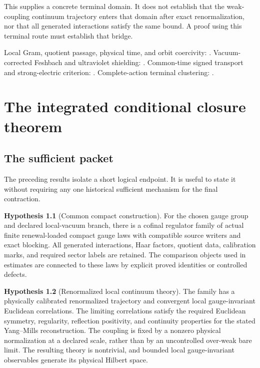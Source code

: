 \documentclass[11pt,oneside,openany]{book}
\theoremstyle{definition}
\newtheorem{hypothesis}[hypothesis]{Hypothesis}
\theoremstyle{remark}
\newcommand{\src}[2]{\cite[#2]{#1}}
\newcommand{\sourcebasis}[1]{\par\smallskip\noindent #1\par}
\begin{document}
This supplies a concrete terminal domain. It does not establish that the weak-coupling continuum trajectory enters that domain after exact renormalization, nor that all generated interactions satisfy the same bound. A proof using this terminal route must establish that bridge.
\sourcebasis{Local Gram, quotient passage, physical time, and orbit coercivity: \src{F1}{V1--V2}. Vacuum-corrected Feshbach and ultraviolet shielding: \src{F1}{V3--V6}. Common-time signed transport and strong-electric criterion: \cite{GT}. Complete-action terminal clustering: \src{F7}{V82--V91}.}

\chapter{The integrated conditional closure theorem}
\label{ch:closure}
\section{The sufficient packet}
The preceding results isolate a short logical endpoint. It is useful to state it without requiring any one historical sufficient mechanism for the final contraction.

\begin{hypothesis}[Common compact construction]\label{hyp:compact}
For the chosen gauge group and declared local-vacuum branch, there is a cofinal regulator family of actual finite renewal-loaded compact gauge laws with compatible source writers and exact blocking. All generated interactions, Haar factors, quotient data, calibration marks, and required sector labels are retained. The comparison objects used in estimates are connected to these laws by explicit proved identities or controlled defects.
\end{hypothesis}

\begin{hypothesis}[Renormalized local continuum theory]\label{hyp:continuum}
The family has a physically calibrated renormalized trajectory and convergent local gauge-invariant Euclidean correlations. The limiting correlations satisfy the required Euclidean symmetry, regularity, reflection positivity, and continuity properties for the stated Yang--Mills reconstruction. The coupling is fixed by a nonzero physical normalization at a declared scale, rather than by an uncontrolled over-weak bare limit. The resulting theory is nontrivial, and bounded local gauge-invariant observables generate its physical Hilbert space.
\end{hypothesis}
\end{document}
